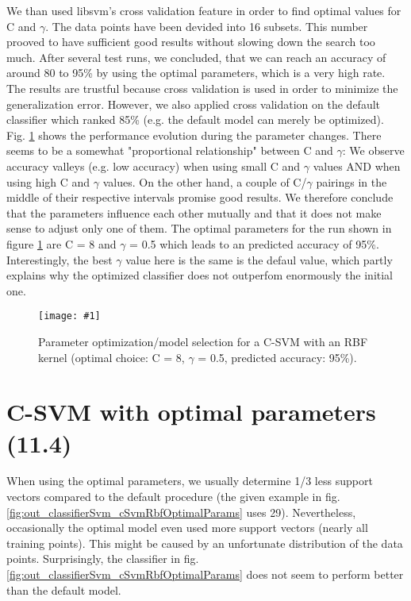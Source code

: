 \documentclass[a4paper,headings=small]{scrartcl}
\newcommand{\image}[3]{
	\begin{figure}[htbp]
		\centering
		\texttt{[image: \#1]}
		\caption{#3}
		\label{fig:#1}
	\end{figure}
}
\begin{document}
We than used libsvm's cross validation feature in order to find optimal values for C and $\gamma$. The data points have been devided into 16 subsets. This number prooved to have sufficient good results without slowing down the search too much. After several test runs, we concluded, that we can reach an accuracy of around 80 to 95\% by using the optimal parameters, which is a very high rate. The results are trustful because cross validation is used in order to minimize the generalization error. However, we also applied cross validation on the default classifier which ranked 85\% (e.g. the default model can merely be optimized). Fig. \ref{fig:out_cSvmRbfParameterOptimization} shows the performance evolution during the parameter changes. There seems to be a somewhat "proportional relationship" between C and $\gamma$: We observe accuracy valleys (e.g. low accuracy) when using small C and $\gamma$ values AND when using high C and $\gamma$ values. On the other hand, a couple of C/$\gamma$ pairings in the middle of their respective intervals promise good results. We therefore conclude that the parameters influence each other mutually and that it does not make sense to adjust only one of them. The optimal parameters for the run shown in figure \ref{fig:out_cSvmRbfParameterOptimization} are C = 8 and $\gamma$ = 0.5 which leads to an predicted accuracy of 95\%. Interestingly, the best $\gamma$ value here is the same is the defaul value, which partly explains why the optimized classifier does not outperfom enormously the initial one.

\image{out_cSvmRbfParameterOptimization}{0.9}%
	{Parameter optimization/model selection for a C-SVM with an RBF kernel (optimal choice: C = 8, $\gamma$ = 0.5, predicted accuracy: 95\%).}


\section{C-SVM with optimal parameters (11.4)}

When using the optimal parameters, we usually determine 1/3 less support vectors compared to the default procedure (the given example in fig. \ref{fig:out_classifierSvm_cSvmRbfOptimalParams} uses 29). Nevertheless, occasionally the optimal model even used more support vectors (nearly all training points). This might be caused by an unfortunate distribution of the data points. Surprisingly, the classifier in fig. \ref{fig:out_classifierSvm_cSvmRbfOptimalParams} does not seem to perform better than the default model.
\end{document}
